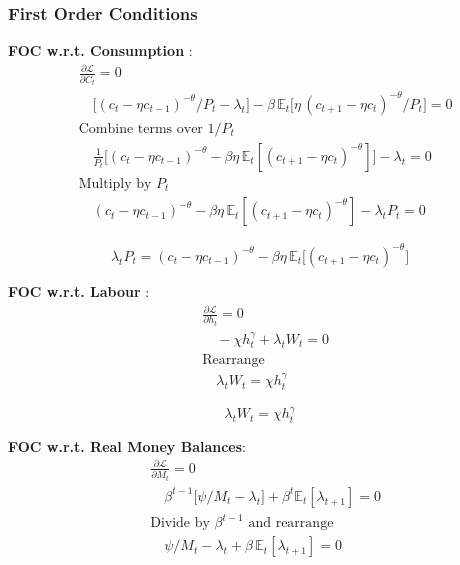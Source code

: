 \documentclass[11pt,preprint]{elsarticle}
\numberwithin{equation}{section}
\numberwithin{figure}{section}
\numberwithin{table}{section}
\begin{document}
\subsubsection{\texorpdfstring{First Order Conditions
\label{household_FOC}}{First Order Conditions }}\label{first-order-conditions}

\textbf{FOC w.r.t. Consumption} : \begin{align*}
  & \frac{\partial \mathcal{L}}{\partial C_t} = 0 \\
  & \quad \bigl[(c_t-\eta c_{t-1})^{-\theta}/P_t - \lambda_t\bigr]
    - \beta\,\mathbb{E}_t\bigl[\eta\,(c_{t+1}-\eta c_t)^{-\theta}/P_t\bigr] = 0 \\[6pt]
  & \text{Combine terms over }1/P_t \\
  & \quad \frac{1}{P_t}\bigl[(c_t-\eta c_{t-1})^{-\theta} - \beta\eta\,\mathbb{E}_t[(c_{t+1}-\eta c_t)^{-\theta}]\bigr] - \lambda_t = 0 \\[6pt]
  & \text{Multiply by }P_t \\
  & \quad (c_t-\eta c_{t-1})^{-\theta} - \beta\eta\,\mathbb{E}_t[(c_{t+1}-\eta c_t)^{-\theta}] - \lambda_t P_t = 0
\end{align*}

\begin{equation}\label{foc_C}
\boxed{
  \lambda_t P_t = (c_t-\eta c_{t-1})^{-\theta} - \beta\eta\,\mathbb{E}_t\bigl[(c_{t+1}-\eta c_t)^{-\theta}\bigr]
}
\end{equation}

\textbf{FOC w.r.t. Labour} : \begin{align*}
  & \frac{\partial \mathcal{L}}{\partial h_t} = 0 \\
  & \quad -\chi h_t^{\gamma} + \lambda_t W_t = 0 \\[6pt]
  & \text{Rearrange} \\
  & \quad \lambda_t W_t = \chi h_t^{\gamma}
\end{align*}

\begin{equation}\label{foc_h}
\boxed{\lambda_t W_t = \chi h_t^{\gamma}}
\end{equation}

\textbf{FOC w.r.t. Real Money Balances}: \begin{align*}
  & \frac{\partial \mathcal{L}}{\partial M_t} = 0 \\
  & \quad \beta^{t-1}\bigl[\psi/M_t - \lambda_t\bigr] + \beta^t\mathbb{E}_t[\lambda_{t+1}] = 0 \\[6pt]
  & \text{Divide by }\beta^{t-1}\text{ and rearrange} \\
  & \quad \psi/M_t - \lambda_t + \beta\,\mathbb{E}_t[\lambda_{t+1}] = 0
\end{align*}
\end{document}
